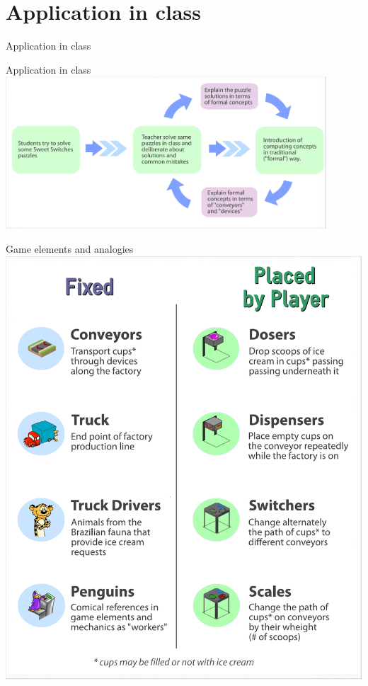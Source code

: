 \documentclass{beamer}
\begin{document}
\section{Application in class}
    \begin{frame}{}
        \centering
        \huge
        Application in class
    \end{frame}

    \begin{frame}{Application in class}
        \centering
        \includegraphics[width=0.9\textwidth]{images/ClassFlow}
    \end{frame}

    \begin{frame}{Game elements and analogies}
        \centering
        \includegraphics[height=0.9\textheight]{images/GameElements}
    \end{frame}
\end{document}
